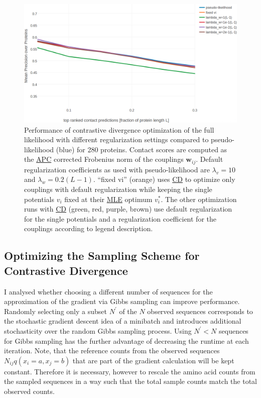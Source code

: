 \documentclass[12pt,a4paper,twoside]{book}
\newcommand{\eq}{\!=\!}
\newcommand{\vi}{v_{i}}
\newcommand{\wij}{\mathbf{w}_{ij}}
\theoremstyle{definition}
\theoremstyle{definition}
\theoremstyle{remark}
\begin{document}
\begin{figure}

{\centering \includegraphics[width=0.9\linewidth]{img/full_likelihood/precision_vs_rank_notitle_cd_comparing_regularizers} 

}

\caption{Performance of contrastive
divergence optimization of the full likelihood with different
regularization settings compared to pseudo-likelihood (blue) for 280
proteins. Contact scores are computed as the
\protect\hyperlink{abbrev}{APC} corrected Frobenius norm of the
couplings \(\wij\). Default regularization coefficients as used with
pseudo-likelihood are \(\lambda_v \eq 10\) and
\(\lambda_w \eq 0.2(L-1)\). ``fixed vi'' (orange) uses
\protect\hyperlink{abbrev}{CD} to optimize only couplings with default
regularization while keeping the single potentials \(\vi\) fixed at
their \protect\hyperlink{abbrev}{MLE} optimum \(\vi^*\). The other
optimization runs with \protect\hyperlink{abbrev}{CD} (green, red,
purple, brown) use default regularization for the single potentials and
a regularization coefficient for the couplings according to legend
description.}\label{fig:precison-cd-regularization}
\end{figure}

\subsection{Optimizing the Sampling Scheme for Contrastive
Divergence}\label{optimizing-the-sampling-scheme-for-contrastive-divergence}

I analysed whether choosing a different number of sequences for the
approximation of the gradient via Gibbs sampling can improve
performance. Randomly selecting only a subset \(N^{\prime}\) of the
\(N\) observed sequences corresponds to the stochastic gradient descent
idea of a minibatch and introduces additional stochasticity over the
random Gibbs sampling process. Using \(N^{\prime} < N\) sequences for
Gibbs sampling has the further advantage of decreasing the runtime at
each iteration. Note, that the reference counts from the observed
sequences \(N_{ij} q(x_i \eq a, x_j \eq b)\) that are part of the
gradient calculation will be kept constant. Therefore it is necessary,
however to rescale the amino acid counts from the sampled sequences in a
way such that the total sample counts match the total observed counts.
\end{document}
